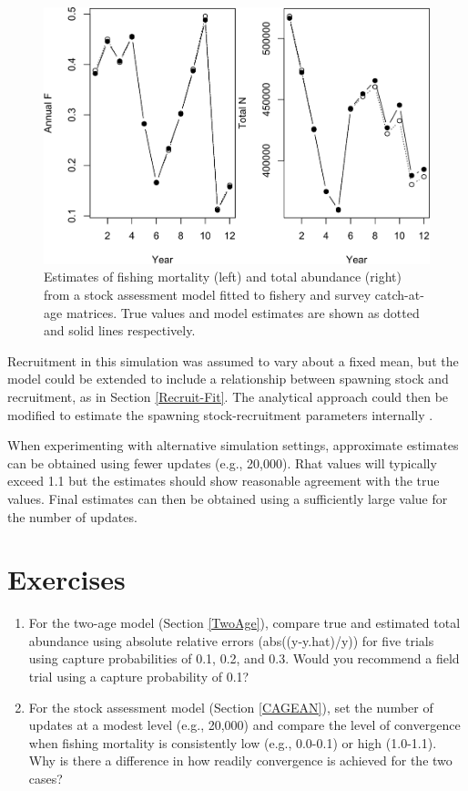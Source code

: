 \documentclass[
]{krantz}
\begin{document}
\begin{figure}
\includegraphics[width=0.9\linewidth]{bookdown_files/figure-latex/CAGEANPlot-1} \caption{Estimates of fishing mortality (left) and total abundance (right) from a stock assessment model fitted to fishery and survey catch-at-age matrices. True values and model estimates are shown as dotted and solid lines respectively.}\label{fig:CAGEANPlot}
\end{figure}

Recruitment in this simulation was assumed to vary about a fixed mean, but the model could be extended to include a relationship between spawning stock and recruitment, as in Section \ref{Recruit-Fit}. The analytical approach could then be modified to estimate the spawning stock-recruitment parameters internally \citep{brooks.deroba_2015}.

When experimenting with alternative simulation settings, approximate estimates can be obtained using fewer updates (e.g., 20,000). Rhat values will typically exceed 1.1 but the estimates should show reasonable agreement with the true values. Final estimates can then be obtained using a sufficiently large value for the number of updates.

\hypertarget{exercises-7}{%
\section{Exercises}\label{exercises-7}}

\begin{enumerate}
\def\labelenumi{\arabic{enumi}.}
\item
  For the two-age model (Section \ref{TwoAge}), compare true and estimated total abundance using absolute relative errors (abs((y-y.hat)/y)) for five trials using capture probabilities of 0.1, 0.2, and 0.3. Would you recommend a field trial using a capture probability of 0.1?
\item
  For the stock assessment model (Section \ref{CAGEAN}), set the number of updates at a modest level (e.g., 20,000) and compare the level of convergence when fishing mortality is consistently low (e.g., 0.0-0.1) or high (1.0-1.1). Why is there a difference in how readily convergence is achieved for the two cases?
\end{enumerate}
\end{document}
